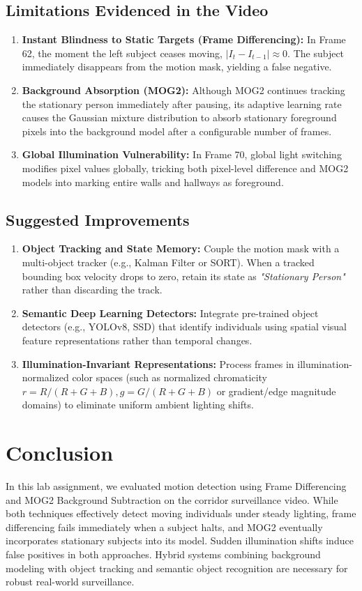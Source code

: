 \documentclass[12pt]{article}
\begin{document}
\subsection{Limitations Evidenced in the Video}
\begin{enumerate}
    \item \textbf{Instant Blindness to Static Targets (Frame Differencing):} In Frame 62, the moment the left subject ceases moving, $|I_t - I_{t-1}| \approx 0$. The subject immediately disappears from the motion mask, yielding a false negative.
    \item \textbf{Background Absorption (MOG2):} Although MOG2 continues tracking the stationary person immediately after pausing, its adaptive learning rate causes the Gaussian mixture distribution to absorb stationary foreground pixels into the background model after a configurable number of frames.
    \item \textbf{Global Illumination Vulnerability:} In Frame 70, global light switching modifies pixel values globally, tricking both pixel-level difference and MOG2 models into marking entire walls and hallways as foreground.
\end{enumerate}

\subsection{Suggested Improvements}
\begin{enumerate}
    \item \textbf{Object Tracking and State Memory:} Couple the motion mask with a multi-object tracker (e.g., Kalman Filter or SORT). When a tracked bounding box velocity drops to zero, retain its state as \emph{"Stationary Person"} rather than discarding the track.
    \item \textbf{Semantic Deep Learning Detectors:} Integrate pre-trained object detectors (e.g., YOLOv8, SSD) that identify individuals using spatial visual feature representations rather than temporal changes.
    \item \textbf{Illumination-Invariant Representations:} Process frames in illumination-normalized color spaces (such as normalized chromaticity $r = R/(R+G+B), g = G/(R+G+B)$ or gradient/edge magnitude domains) to eliminate uniform ambient lighting shifts.
\end{enumerate}

\section{Conclusion}
In this lab assignment, we evaluated motion detection using Frame Differencing and MOG2 Background Subtraction on the corridor surveillance video. While both techniques effectively detect moving individuals under steady lighting, frame differencing fails immediately when a subject halts, and MOG2 eventually incorporates stationary subjects into its model. Sudden illumination shifts induce false positives in both approaches. Hybrid systems combining background modeling with object tracking and semantic object recognition are necessary for robust real-world surveillance.
\end{document}
